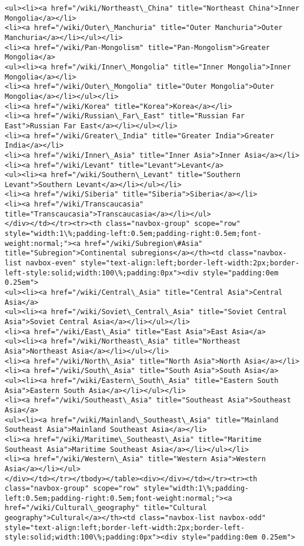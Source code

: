 \documentclass[11pt]{article}
\begin{document}
\begin{Verbatim}[commandchars=\\\{\}]
<ul><li><a href="/wiki/Northeast\_China" title="Northeast China">Inner Mongolia</a></li>
<li><a href="/wiki/Outer\_Manchuria" title="Outer Manchuria">Outer Manchuria</a></li></ul></li>
<li><a href="/wiki/Pan-Mongolism" title="Pan-Mongolism">Greater Mongolia</a>
<ul><li><a href="/wiki/Inner\_Mongolia" title="Inner Mongolia">Inner Mongolia</a></li>
<li><a href="/wiki/Outer\_Mongolia" title="Outer Mongolia">Outer Mongolia</a></li></ul></li>
<li><a href="/wiki/Korea" title="Korea">Korea</a></li>
<li><a href="/wiki/Russian\_Far\_East" title="Russian Far East">Russian Far East</a></li></ul></li>
<li><a href="/wiki/Greater\_India" title="Greater India">Greater India</a></li>
<li><a href="/wiki/Inner\_Asia" title="Inner Asia">Inner Asia</a></li>
<li><a href="/wiki/Levant" title="Levant">Levant</a>
<ul><li><a href="/wiki/Southern\_Levant" title="Southern Levant">Southern Levant</a></li></ul></li>
<li><a href="/wiki/Siberia" title="Siberia">Siberia</a></li>
<li><a href="/wiki/Transcaucasia" title="Transcaucasia">Transcaucasia</a></li></ul>
</div></td></tr><tr><th class="navbox-group" scope="row" style="width:1\%;padding-left:0.5em;padding-right:0.5em;font-weight:normal;"><a href="/wiki/Subregion\#Asia" title="Subregion">Continental subregions</a></th><td class="navbox-list navbox-even" style="text-align:left;border-left-width:2px;border-left-style:solid;width:100\%;padding:0px"><div style="padding:0em 0.25em">
<ul><li><a href="/wiki/Central\_Asia" title="Central Asia">Central Asia</a>
<ul><li><a href="/wiki/Soviet\_Central\_Asia" title="Soviet Central Asia">Soviet Central Asia</a></li></ul></li>
<li><a href="/wiki/East\_Asia" title="East Asia">East Asia</a>
<ul><li><a href="/wiki/Northeast\_Asia" title="Northeast Asia">Northeast Asia</a></li></ul></li>
<li><a href="/wiki/North\_Asia" title="North Asia">North Asia</a></li>
<li><a href="/wiki/South\_Asia" title="South Asia">South Asia</a>
<ul><li><a href="/wiki/Eastern\_South\_Asia" title="Eastern South Asia">Eastern South Asia</a></li></ul></li>
<li><a href="/wiki/Southeast\_Asia" title="Southeast Asia">Southeast Asia</a>
<ul><li><a href="/wiki/Mainland\_Southeast\_Asia" title="Mainland Southeast Asia">Mainland Southeast Asia</a></li>
<li><a href="/wiki/Maritime\_Southeast\_Asia" title="Maritime Southeast Asia">Maritime Southeast Asia</a></li></ul></li>
<li><a href="/wiki/Western\_Asia" title="Western Asia">Western Asia</a></li></ul>
</div></td></tr></tbody></table><div></div></td></tr><tr><th class="navbox-group" scope="row" style="width:1\%;padding-left:0.5em;padding-right:0.5em;font-weight:normal;"><a href="/wiki/Cultural\_geography" title="Cultural geography">Cultural</a></th><td class="navbox-list navbox-odd" style="text-align:left;border-left-width:2px;border-left-style:solid;width:100\%;padding:0px"><div style="padding:0em 0.25em">

\end{Verbatim}
\end{document}

